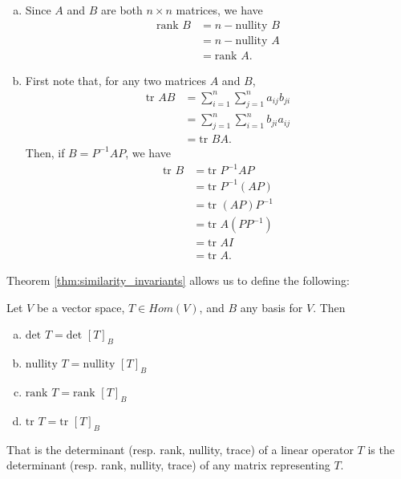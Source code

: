\documentclass[12pt,letterpaper,reqno]{article}
\numberwithin{equation}{section}
\newcommand{\fixme}[1]{{\color{orange}{[#1]}}}
\begin{document}
\begin{pf}
\begin{enumerate}[(a)]
	\item Since $A$ and $B$ are both $n \times n$ matrices, we have 
	\begin{align*}
		\text{rank }B &=n-\text{nullity }B \\
		&=n-\text{nullity }A \\
		&=\text{rank }A.
	\end{align*}
	\item First note that, for any two matrices $A$ and $B$, 
	\begin{align*}
		\text{tr }AB &= \sum_{i=1}^n\sum_{j=1}^n a_{ij}b_{ji} \\
		&= \sum_{j=1}^n\sum_{i=1}^n b_{ji}a_{ij} \\
		&=\text{tr }BA.
	\end{align*}
	Then, if $B=P^{-1}AP$, we have
	\begin{align*}
		\text{tr }B&=\text{tr }P^{-1}AP \\
		&=\text{tr }P^{-1}(AP) \\
		&=\text{tr }(AP)P^{-1} \\
		&=\text{tr }A(PP^{-1}) \\
		&=\text{tr }AI \\
		&=\text{tr }A.
	\end{align*} 
	\end{enumerate}
	
\end{pf}
Theorem \ref{thm:similarity_invariants} allows us to define the following:
\begin{defn}
	Let $V$ be a vector space, $T \in Hom(V)$, and $B$ any basis for $V$. Then 
\begin{enumerate}[(a)]
	\item $\text{det }T=\text{det }[T]_B$
	\item $\text{nullity }T=\text{nullity }[T]_B$
	\item $\text{rank }T=\text{rank }[T]_B$
	\item $\text{tr }T=\text{tr }[T]_B$
\end{enumerate}
That is the determinant (resp. rank, nullity, trace) of a linear operator $T$ is the determinant (resp. rank, nullity, trace) of any matrix representing $T$.
\end{defn}

\fixme{Add example.}
\end{document}

